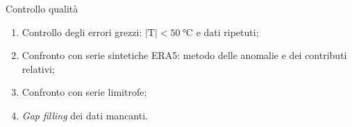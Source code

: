 \begin{frame}{Controllo qualità}
  \begin{enumerate}
    \item Controllo degli errori grezzi: \(\lvert \mathrm{T} \rvert < \qty{50}{\degreeCelsius}\) e dati ripetuti;
    \item Confronto con serie sintetiche ERA5: metodo delle anomalie e dei contributi relativi;
    \item Confronto con serie limitrofe;
    \item \emph{Gap filling} dei dati mancanti.
  \end{enumerate}
\end{frame}
